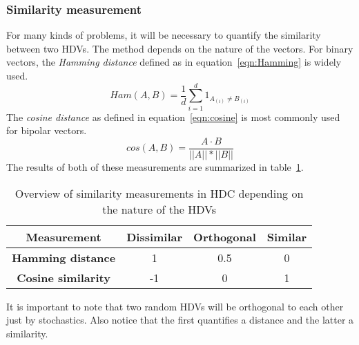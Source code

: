 \subsubsection{Similarity measurement} \label{sssec:sim}
For many kinds of problems, it will be necessary to quantify the similarity between two HDVs. The method depends on the nature of the vectors. For binary vectors, the \textit{Hamming distance} defined as in equation~\ref{eqn:Hamming} is widely used.
\begin{equation}
    \label{eqn:Hamming}
    Ham(A, B) = \frac{1}{d} \sum_{i=1}^{d} 1_{A_{(i)} \neq B_{(i)}}
\end{equation}
The \textit{cosine distance} as defined in equation~\ref{eqn:cosine} is most commonly used for bipolar vectors.
\begin{equation}
    \label{eqn:cosine}
    cos(A, B) = \frac{A \cdot B}{||A|| * ||B||}
\end{equation}
The results of both of these measurements are summarized in table~\ref{tab:dist}.
\begin{table}[h]
    \begin{tabular}{|c||c|c|c|}
        \hline
        \textbf{Measurement} & \textbf{Dissimilar} & \textbf{Orthogonal} & \textbf{Similar} \\
        \hline
        \textbf{Hamming distance} & 1 & 0.5 & 0 \\
        \hline
        \textbf{Cosine similarity} & -1 & 0 & 1 \\
        \hline
    \end{tabular}
    \caption{\label{tab:dist}Overview of similarity measurements in HDC depending on the nature of the HDVs} 
\end{table}
It is important to note that two random HDVs will be orthogonal to each other just by stochastics. Also notice that the first quantifies a distance and the latter a similarity.
